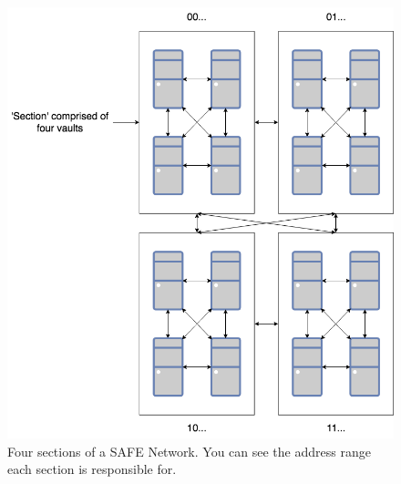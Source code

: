 \begin{figure}
	\begin{center}
		\includegraphics[width=\textwidth]{diagrams/safe-network-sections}
		\caption{Four sections of a SAFE Network. You can see the address range each section is responsible for.}
		\label{fig:safe-sections}
	\end{center}
\end{figure}

